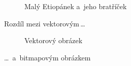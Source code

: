 \documentclass[11pt, a4paper]{article}
\begin{document}
\begin{figure}[h]
{            
            }
        \caption{Malý Etiopánek a~jeho bratříček}
        \label{figure:etiopanek}
\end{figure}
\pagebreak

Rozdíl mezi vektorovým\,\dots
        
\begin{figure}[h]
    \centering
    \caption{Vektorový obrázek}
    \label{figure:vektor}
\end{figure}
\bigskip
\noindent
\dots\, a~bitmapovým obrázkem
\end{document}
